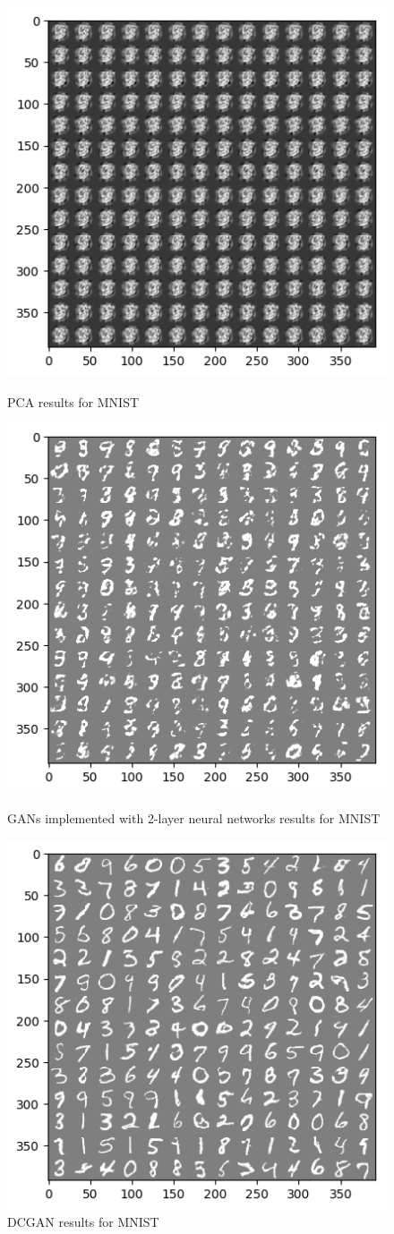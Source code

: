 \documentclass[10pt,twocolumn,letterpaper]{article}
\begin{document}
\begin{figure}[h]
\begin{center}
   \includegraphics[width=0.6\linewidth]{img/pcaresult.png}
\end{center}
   \caption{PCA results for MNIST}
\label{fig:long}
\label{fig:onecol}
\begin{center}
   \includegraphics[width=0.6\linewidth]{img/gannn.png}
\end{center}
   \caption{GANs implemented with 2-layer neural networks results for MNIST}
\label{fig:long}
\label{fig:onecol}
\begin{center}
   \includegraphics[width=0.6\linewidth]{img/dcgan.png}
\end{center}
   \caption{DCGAN results for MNIST}
\label{fig:long}
\label{fig:onecol}
\end{figure}
\end{document}
